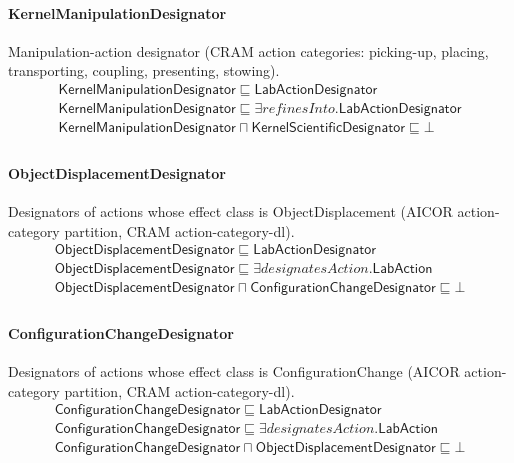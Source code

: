 \documentclass[10pt]{article}
\begin{document}
\paragraph{KernelManipulationDesignator} Manipulation-action designator (CRAM action categories: picking-up, placing, transporting, coupling, presenting, stowing).
\[\begin{array}{l}
\mathsf{KernelManipulationDesignator} \sqsubseteq  \mathsf{LabActionDesignator} \\
\mathsf{KernelManipulationDesignator} \sqsubseteq  \exists \mathit{refinesInto}.\mathsf{LabActionDesignator} \\
\mathsf{KernelManipulationDesignator} \sqcap  \mathsf{KernelScientificDesignator} \sqsubseteq  \bot  \\
\end{array}\]
\paragraph{ObjectDisplacementDesignator} Designators of actions whose effect class is ObjectDisplacement (AICOR action-category partition, CRAM action-category-dl).
\[\begin{array}{l}
\mathsf{ObjectDisplacementDesignator} \sqsubseteq  \mathsf{LabActionDesignator} \\
\mathsf{ObjectDisplacementDesignator} \sqsubseteq  \exists \mathit{designatesAction}.\mathsf{LabAction} \\
\mathsf{ObjectDisplacementDesignator} \sqcap  \mathsf{ConfigurationChangeDesignator} \sqsubseteq  \bot  \\
\end{array}\]
\paragraph{ConfigurationChangeDesignator} Designators of actions whose effect class is ConfigurationChange (AICOR action-category partition, CRAM action-category-dl).
\[\begin{array}{l}
\mathsf{ConfigurationChangeDesignator} \sqsubseteq  \mathsf{LabActionDesignator} \\
\mathsf{ConfigurationChangeDesignator} \sqsubseteq  \exists \mathit{designatesAction}.\mathsf{LabAction} \\
\mathsf{ConfigurationChangeDesignator} \sqcap  \mathsf{ObjectDisplacementDesignator} \sqsubseteq  \bot  \\
\end{array}\]
\end{document}
